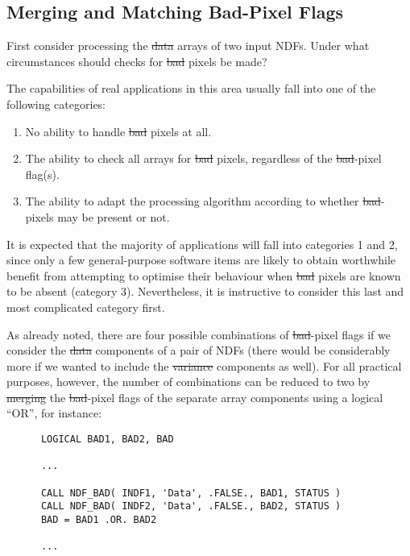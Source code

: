 \subsection{\label{ss:mbad}Merging and Matching Bad-Pixel Flags}

First consider processing the \st{data\/} arrays of two input NDFs.
Under what circumstances should checks for \st{bad\/} pixels be made? 

The capabilities of real applications in this area usually fall into one of
the following categories: 

\begin{enumerate}

\item No ability to handle \st{bad\/} pixels at all.

\item The ability to check all arrays for \st{bad\/} pixels, regardless of
the \st{bad\/}-pixel flag(s). 

\item The ability to adapt the processing algorithm according to whether
\st{bad\/}-pixels may be present or not. 

\end{enumerate}

It is expected that the majority of applications will fall into categories 1
and 2, since only a few general-purpose software items are likely to obtain
worthwhile benefit from attempting to optimise their behaviour when
\st{bad\/} pixels are known to be absent (category 3).  
Nevertheless, it is instructive to consider this last and most complicated
category first. 

As already noted, there are four possible combinations of \st{bad\/}-pixel
flags if we consider the \st{data\/} components of a pair of NDFs (there
would be considerably more if we wanted to include the \st{variance\/}
components as well). 
For all practical purposes, however, the number of combinations can be
reduced to two by \st{merging\/} the \st{bad\/}-pixel flags of the separate 
array components using a logical ``OR'', for instance: 

\small
\begin{verbatim}
      LOGICAL BAD1, BAD2, BAD

      ...

      CALL NDF_BAD( INDF1, 'Data', .FALSE., BAD1, STATUS )
      CALL NDF_BAD( INDF2, 'Data', .FALSE., BAD2, STATUS )
      BAD = BAD1 .OR. BAD2

      ...
\end{verbatim}
\normalsize

